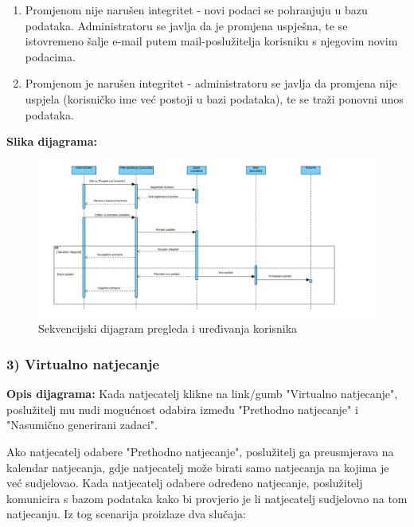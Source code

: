 				\begin{enumerate}
					    \item Promjenom nije narušen integritet - novi podaci se pohranjuju u bazu podataka. Administratoru se javlja da je promjena uspješna, te se istovremeno šalje e-mail putem mail-poslužitelja korisniku s njegovim novim podacima.
						\item Promjenom je narušen integritet - administratoru se javlja da promjena nije uspjela (korisničko ime već postoji u bazi podataka), te se traži ponovni unos podataka.
				\end{enumerate}
					
					\textbf{Slika dijagrama:}
					\begin{figure}[H]
					\centering
						\includegraphics[scale=0.4]{slike/Pregled korisnika}
						\centering
					\caption{Sekvencijski dijagram pregleda i uređivanja korisnika}
					\end{figure}
					
					\subsubsection{3) Virtualno natjecanje}
					
					\textbf{Opis dijagrama:}
					Kada natjecatelj klikne na link/gumb "Virtualno natjecanje", poslužitelj mu nudi mogućnost odabira između "Prethodno natjecanje" i "Nasumično generirani zadaci".
					
					Ako natjecatelj odabere "Prethodno natjecanje", poslužitelj ga preusmjerava na kalendar natjecanja, gdje natjecatelj može birati samo natjecanja na kojima je već sudjelovao. Kada natjecatelj odabere određeno natjecanje, poslužitelj komunicira s bazom podataka kako bi provjerio je li natjecatelj sudjelovao na tom natjecanju. Iz tog scenarija proizlaze dva slučaja:
					
